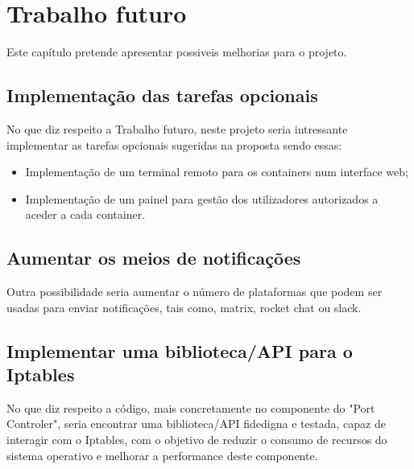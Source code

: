\chapter{Trabalho futuro}
\label{cap:future}

Este capítulo pretende apresentar possiveis melhorias para o projeto.


\section{Implementação das tarefas opcionais}

No que diz respeito a Trabalho futuro, neste projeto seria intressante 
implementar as tarefas opcionais sugeridas na proposta sendo essas:

\begin{itemize}
    \item Implementação de um terminal remoto para os 
    containers num interface web;
    \item Implementação de um painel para gestão dos 
    utilizadores autorizados a aceder a cada 
    container.
\end{itemize} 


\section{Aumentar os meios de notificações}

Outra possibilidade seria aumentar o número de plataformas que podem ser usadas 
para enviar notificações, tais como, matrix, rocket chat ou slack. \\


\section{Implementar uma biblioteca/API para o Iptables}

No que diz respeito a código, mais concretamente no componente do "Port Controler",
seria encontrar uma biblioteca/API fidedigna e testada, capaz de interagir com o Iptables,
com o objetivo de reduzir o consumo de recursos do sistema operativo e melhorar 
a performance deste componente.